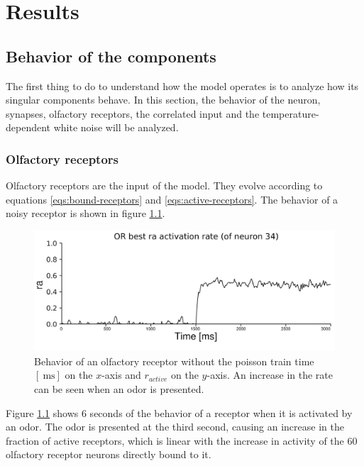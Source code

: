 \graphicspath{{chapters/05/images/}}
\chapter{Results}

\section{Behavior of the components}
\label{sec:behavior-components}
The first thing to do to understand how the model operates is to analyze how its singular components behave.
In this section, the behavior of the neuron, synapses, olfactory receptors, the correlated input and the temperature-dependent white noise will be analyzed.

  \subsection{Olfactory receptors}
  Olfactory receptors are the input of the model.
  They evolve according to equations \ref{eqs:bound-receptors} and \ref{eqs:active-receptors}.
  The behavior of a noisy receptor is shown in figure \ref{fig:receptors_no_poisson}.

  \begin{figure}
    \centering
    \includegraphics[width=\textwidth]{or_activation_without_poisson_0.0_6000.0}
    \caption{Behavior of an olfactory receptor without the poisson train time $[\SI{}{\milli\second}]$ on the $x$-axis and $r_{active}$ on the $y$-axis. An increase in the rate can be seen when an odor is presented.}
    \label{fig:receptors_no_poisson}
  \end{figure}

  Figure \ref{fig:receptors_no_poisson} shows $6$ seconds of the behavior of a receptor when it is activated by an odor.
  The odor is presented at the third second, causing an increase in the fraction of active receptors, which is linear with the increase in activity of the $60$ olfactory receptor neurons directly bound to it.\\

